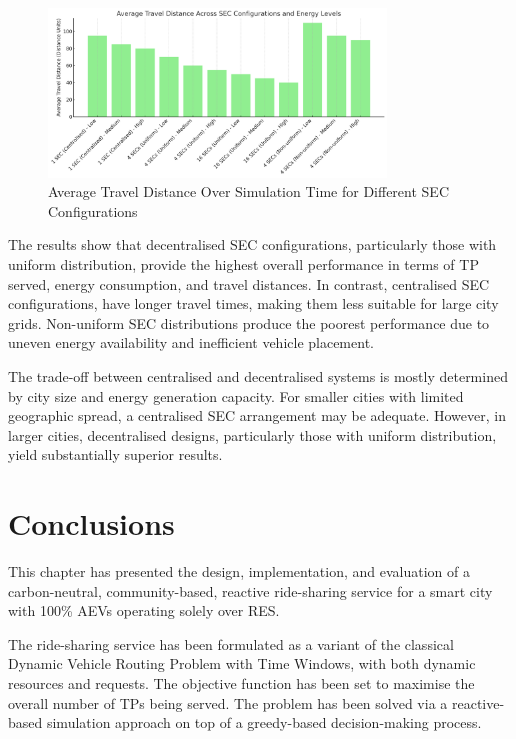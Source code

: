\begin{figure}[h!]
    \centering
    \includegraphics[width=0.8\textwidth]{Crest/Images/average_travel_distance.png}
    \caption{Average Travel Distance Over Simulation Time for Different SEC Configurations}
    \label{fig:average_travel_distance}
\end{figure}

The results show that decentralised SEC configurations, particularly those with uniform distribution, provide the highest overall performance in terms of TP served, energy consumption, and travel distances. In contrast, centralised SEC configurations, have longer travel times, making them less suitable for large city grids. Non-uniform SEC distributions produce the poorest performance due to uneven energy availability and inefficient vehicle placement.

The trade-off between centralised and decentralised systems is mostly determined by city size and energy generation capacity. For smaller cities with limited geographic spread, a centralised SEC arrangement may be adequate. However, in larger cities, decentralised designs, particularly those with uniform distribution, yield substantially superior results.


\section{Conclusions}
\label{sec:conclusion}
This chapter has presented the design, implementation, and evaluation of a carbon-neutral, community-based, reactive ride-sharing service for a smart city with 100\% AEVs operating solely over RES.  

The ride-sharing service has been formulated as a variant of the classical Dynamic Vehicle Routing Problem with Time Windows, with both dynamic resources and requests. The objective function has been set to maximise the overall number of TPs being served. The problem has been solved via a reactive-based simulation approach on top of a greedy-based decision-making process.  

